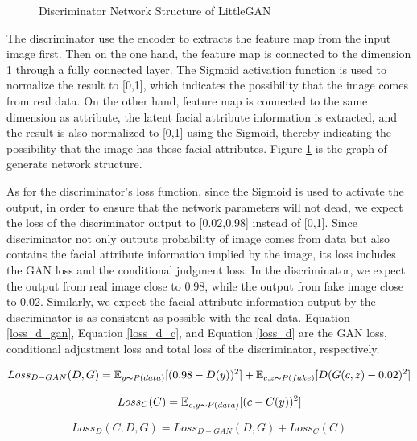 \begin{figure}
\begin{minipage}[t]{0.48\linewidth}
        \caption{Discriminator Network Structure of LittleGAN}
        \label{net_discriminator}
    \end{minipage}
\end{figure}

The discriminator use the encoder to extracts the feature map from the input image first.
Then on the one hand, the feature map is connected to the dimension 1 through a fully connected layer.
The Sigmoid activation function is used to normalize the result to [0,1],
    which indicates the possibility that the image comes from real data.
On the other hand, feature map is connected to the same dimension as attribute,
    the latent facial attribute information is extracted,
    and the result is also normalized to [0,1] using the Sigmoid,
    thereby indicating the possibility that the image has these facial attributes.
Figure \ref{net_discriminator} is the graph of generate network structure.

As for the discriminator's loss function, since the Sigmoid is used to activate the output,
    in order to ensure that the network parameters will not dead,
    we expect the loss of the discriminator output to [0.02,0.98] instead of [0,1].
Since discriminator not only outputs probability of image comes from data but also contains the facial attribute information implied by the image,
    its loss includes the GAN loss and the conditional judgment loss.
In the discriminator, we expect the output from real image close to 0.98, while the output from fake image close to 0.02.
Similarly, we expect the facial attribute information output by the discriminator is as consistent as possible with the real data.
Equation \eqref{loss_d_gan}, Equation \eqref{loss_d_c}, and Equation \eqref{loss_d} are the GAN loss,
    conditional adjustment loss and total loss of the discriminator, respectively.

\begin{equation}
    Loss_{D-GAN}(D,G)=
    \mathbb{E}_{y\thicksim P(data)}[(0.98-D(y))^2]+
    \mathbb{E}_{c,z\thicksim P(fake)}[D(G(c,z)-0.02)^2]
    \label{loss_d_gan}
\end{equation}


\begin{equation}
    Loss_{C}(C)=
    \mathbb{E}_{c,y\thicksim P(data)}[(c-C(y))^2]
    \label{loss_d_c}
\end{equation}

\begin{equation}
    Loss_{D}(C,D,G)=
    Loss_{D-GAN}(D,G)+
    Loss_{C}(C)
    \label{loss_d}
\end{equation}

